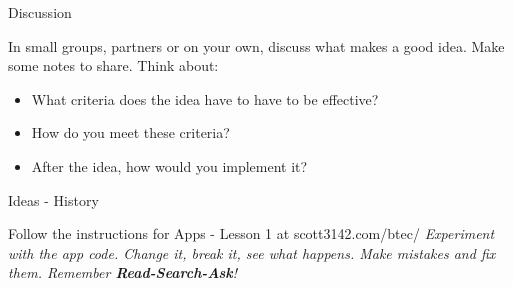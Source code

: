 \documentclass[10pt]{beamer}
\begin{document}
\begin{frame}{Discussion}
	\begin{tcolorbox}[title=Discussion (15 mins)]
		In small groups, partners or on your own, discuss what makes a good idea. Make some notes to share.
		\tcblower
		Think about: 
		\begin{itemize}
			\item What criteria does the idea have to have to be effective? 
			\item How do you meet these criteria? 
			\item After the idea, how would you implement it?
		\end{itemize}
	\end{tcolorbox}
\end{frame}

\begin{frame}{Ideas - History}
	\begin{tcolorbox}[title=Experimenting with Exisiting Apps (20 mins)]
		Follow the instructions for Apps - Lesson 1 at scott3142.com/btec/
		\tcblower
		\textit{Experiment with the app code. Change it, break it, see what happens. Make mistakes and fix them. Remember \textbf{Read-Search-Ask}!}
	\end{tcolorbox}
\end{frame}
\end{document}
